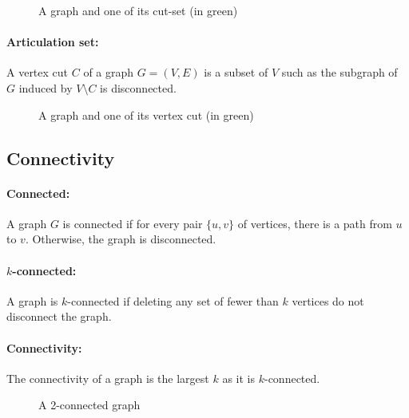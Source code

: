 \begin{figure}[!h]
  \caption{A graph and one of its cut-set (in green)}
  \begin{center}
    
  \end{center}
\end{figure}


\paragraph{Articulation set:}
A vertex cut $C$ of a graph $G=(V,E)$ is a subset of $V$ such as the subgraph
of $G$ induced by $V \setminus C$ is disconnected.

\begin{figure}[!h]
  \caption{A graph and one of its vertex cut (in green)}
  \begin{center}
    
  \end{center}
\end{figure}

\subsection{Connectivity}
\paragraph{Connected:}\label{defConnectivity}
A graph $G$ is connected if for every pair $\{u,v\}$ of vertices, there is a 
path from $u$ to $v$. Otherwise, the graph is disconnected.

\paragraph{$k$-connected:}
A graph is $k$-connected if deleting any set of fewer than $k$ vertices do not 
disconnect the graph.

\paragraph{Connectivity:}
The connectivity of a graph is the largest $k$ as it is $k$-connected. 

\begin{figure}[!h]
  \caption{A 2-connected graph}
  \begin{center}
    
  \end{center}
\end{figure}

